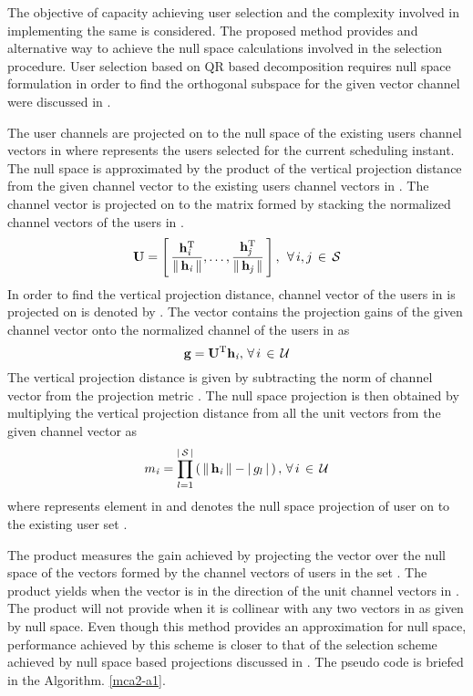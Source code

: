 
The objective of capacity achieving user selection and the complexity involved in implementing the same is considered. The proposed method provides and alternative way to achieve the null space calculations involved in the selection procedure. User selection based on QR based decomposition requires null space formulation in order to find the orthogonal subspace for the given vector channel were discussed in \cite{traniterative,zhang2007user,sun2009eigenmode}.

The user channels are projected on to the null space of the existing users channel vectors in  where  represents the users selected for the current scheduling instant. The null space is approximated by the product of the vertical projection distance from the given channel vector to the existing users channel vectors in . The channel vector  is projected on to the matrix  formed by stacking the normalized channel vectors of the users in .
\begin{equation}
\mathbf{U} = \left [ \, \frac{\mathbf{h}_{\mathit{i}}^{\mathrm{T}}}{\|\, \mathbf{h}_{\mathit{i}} \,\|}, \dotsc, \frac{\mathbf{h}_{\mathit{j}}^{\mathrm{T}}}{\|\, \mathbf{h}_{\mathit{j}} \,\|} \, \right ], \; \, \forall \, i,j \, \in \, \mathcal{S}
\label{mca2-e1}
\end{equation}
In order to find the vertical projection distance, channel vector of the users in  is projected on  is  denoted by . The vector  contains the projection gains of the given channel vector onto the normalized channel of the users in  as
\begin{equation}
\mathbf{g} = \mathbf{U}^{\mathrm{T}} \mathbf{h}_{\mathit{i}}, \, \forall \, i \, \in \, \mathcal{U}
\label{mca2-e2}
\end{equation}
The vertical projection distance is given by subtracting the norm of channel vector from the projection metric . The null space projection is then obtained by multiplying the vertical projection distance from all the unit vectors from the given channel vector as
\begin{equation}
{m}_{\mathit{i}} = \prod^{| \, \mathcal{S} \, |}_{l = 1} \left ( \, \|\, \mathbf{h}_{\mathit{i}} \,\| - | \, g_l \, | \, \right ), \, \forall \, i \, \in \, \mathcal{U}
\label{mca2-e3}
\end{equation}
where  represents  element in  and  denotes the null space projection of user  on to the existing user set .

The product measures the gain achieved by projecting the vector  over the null space of the vectors formed by the channel vectors of users in the set . The product yields  when the vector  is in the direction of the unit channel vectors in . The product will not provide  when it is collinear with any two vectors in  as given by null space. Even though this method provides an approximation for null space, performance achieved by this scheme is closer to that of the selection scheme achieved by null space based projections discussed in \cite{sus2006zfbf,icsps2010}. The pseudo code is briefed in the Algorithm. \ref{mca2-a1}.

